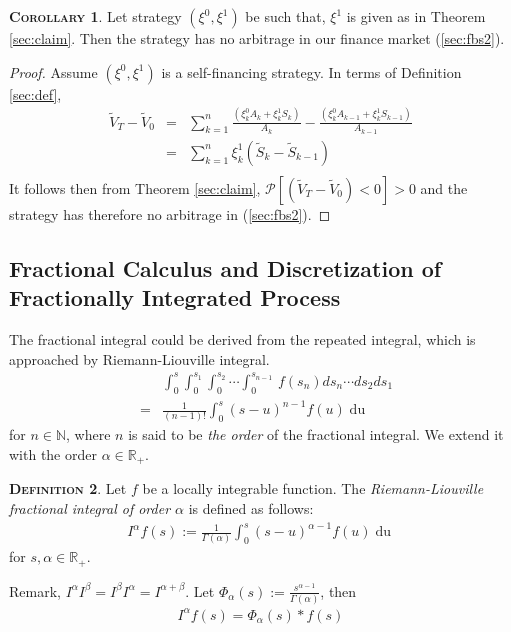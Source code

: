 \documentclass[a4paper, twoside, 11pt]{article}
\theoremstyle{definition}
\newtheorem{definition}{\scshape Definition}[section]
\newtheorem{corollary}[definition]{\scshape Corollary}
\begin{document}
  \begin{corollary}
	Let strategy $(\xi^0, \xi^1)$ be such that, $\xi^1$ is given as in Theorem \ref{sec:claim}. Then the strategy has no arbitrage in our finance market (\ref{sec:fbs2}).
  \end{corollary}
  \begin{proof}
	Assume $(\xi^0, \xi^1)$ is a self-financing strategy. In terms of Definition \ref{sec:def},
	\begin{eqnarray*}
	\tilde{V}_T - \tilde{V}_0 &=&  \sum_{k=1} ^ {n} \frac{(\xi^0_kA_{k} + \xi^1_kS_{k})}{A_{k}} - \frac{(\xi^0_{k}A_{k-1} + \xi^1_{k}S_{k-1})}{A_{k-1}}\\
	&=&  \sum_{k=1}^{n} \xi^1_k (\tilde{S}_{k} - \tilde{S}_{k-1})\\
  \end{eqnarray*}
  It follows then from Theorem \ref{sec:claim}, $\mathcal{P}[(\tilde{V}_T - \tilde{V}_0) < 0] > 0$ and the strategy has therefore no arbitrage in (\ref{sec:fbs2}).
  \end{proof}


  \subsection{Fractional Calculus and Discretization of Fractionally Integrated Process}
  The fractional integral could be derived from the repeated integral, which is approached by Riemann-Liouville integral.
  \begin{eqnarray*}
	&&\int_0^s\int_0^{s_1}\int_0^{s_2}\cdots\int_0^{s_{n-1}}\, f(s_n)ds_n\cdots ds_2 ds_1\\
	&=& \frac{1}{(n-1)!} \int_0^s (s-u)^{n-1} f(u) \mathop{du}
  \end{eqnarray*}
  for $n\in \mathbb{N}$, where $n$ is said to be \emph{the order} of the fractional integral. We extend it with the order $\alpha \in \mathbb{R}_+$.
  \begin{definition}
	Let $f$ be a locally integrable function. The \emph{Riemann-Liouville fractional integral of order $\alpha$} is defined as follows:
  \begin{eqnarray}
	I^\alpha f(s) := \frac{1}{\Gamma(\alpha)} \int^s_0 (s-u)^{\alpha-1} f(u) \mathop{du}
	\label{sec:fraint}
  \end{eqnarray}
  for $s, \alpha \in \mathbb{R}_+$.
  \end{definition}

  Remark, $I^\alpha I^\beta = I^\beta I^\alpha = I^{\alpha+\beta}$.
  Let $\Phi_\alpha(s):= \frac{s^{\alpha-1}}{\Gamma(\alpha)}$,  then
  \begin{eqnarray}
	I^\alpha f(s) = \Phi_\alpha(s) \ast f(s)
  \end{eqnarray}
\end{document}
